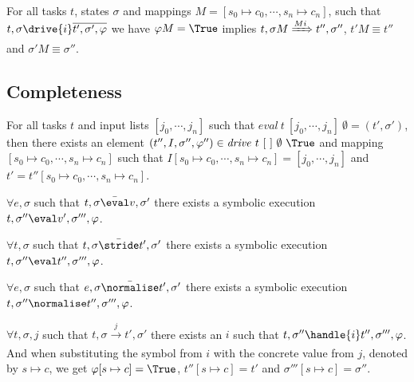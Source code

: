\begin{lemma}
  \label{lem:sounddrive}

  For all tasks $t$, states $\sigma$ and mappings $M=[s_0\mapsto c_0,\cdots,s_n\mapsto c_n]$,
  such that $t,\sigma\drive{i} \overline{t',\sigma',\phi}$
  we have $\phi M = \True$ implies
  $t,\sigma M \xRightarrow[]{M i} t'',\sigma''$, $t'M \equiv t''$ and $\sigma' M \equiv \sigma''$.
\end{lemma}



\subsection{Completeness}



\begin{theorem}
For all tasks $t$ and input lists $[j_0,\cdots,j_n]$ such that $\mathit{eval}\ t\ [j_0,\cdots,j_n]\ \emptyset = (t',\sigma')$,
then there exists an element $(t'',I,\sigma'',\phi'')\in \mathit{drive}\ t\ [\ ]\ \emptyset\ \True$ and mapping $[s_0\mapsto c_0,\cdots,s_n\mapsto c_n]$ such that
$I[s_0\mapsto c_0,\cdots,s_n\mapsto c_n]=[j_0,\cdots,j_n]$ and $t'=t''[s_0\mapsto c_0,\cdots,s_n\mapsto c_n]$.
  \label{thm:complete}
\end{theorem}


\begin{lemma}
  \label{lem:completeEval}
  $\forall e,\sigma$ such that $t,\sigma \bar{\eval}v,\sigma'$
  there exists a symbolic execution $t,\sigma''\eval v',\sigma''',\phi$.
\end{lemma}


\begin{lemma}
  \label{lem:completeStride}
  $\forall t,\sigma$ such that $t,\sigma \bar{\stride}t',\sigma'$
  there exists a symbolic execution $t,\sigma''\eval t'',\sigma''',\phi$.
\end{lemma}


\begin{lemma}
  \label{lem:completeNormalise}
  $\forall e,\sigma$ such that $e,\sigma \bar{\normalise}t',\sigma'$
  there exists a symbolic execution $t,\sigma''\normalise t'',\sigma''',\phi$.
\end{lemma}


\begin{lemma}
  \label{lem:completeHandle}
  $\forall t,\sigma,j$ such that $t,\sigma \xrightarrow[]{j} t',\sigma'$
  there exists an $i$ such that $t,\sigma''\handle{i} t'',\sigma''',\phi$. And when substituting the symbol from $i$ with the concrete value from $j$, denoted by $s\mapsto c$, we get $\phi[s\mapsto c]=\True$, $t''[s\mapsto c]= t'$ and $\sigma'''[s\mapsto c]=\sigma''$.
\end{lemma}


